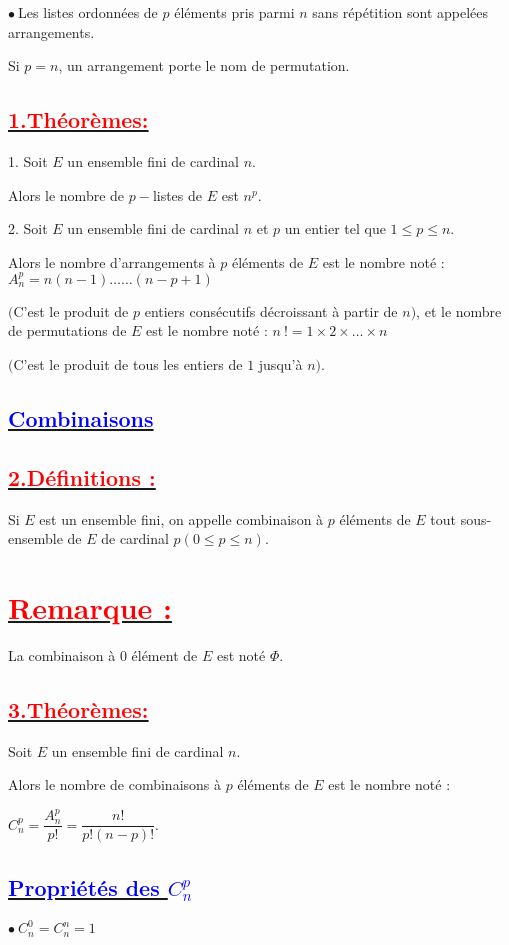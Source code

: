 \documentclass[12pt]{article}
\begin{document}
$\bullet\ $Les listes ordonnées de $p$ éléments pris parmi $n$ sans répétition sont appelées arrangements.

Si $p=n$, un arrangement porte le nom de permutation.
\subsection*{\underline{\textbf{\textcolor{red}{1.Théorèmes:}}}}
1. Soit $E$ un ensemble fini de cardinal $n.$

Alors le nombre de $p-$listes de $E$ est $n^{p}.$

2. Soit $E$ un ensemble fini de cardinal $n$ et $p$ un entier tel que $1\leq p\leq n.$

Alors le nombre d'arrangements à $p$ éléments de $E$ est le nombre noté : $A_{n}^{p}=n(n-1)\ldots\ldots(n-p+1)$

$($C'est le produit de $p$ entiers consécutifs décroissant à partir de $n)$, et le nombre de permutations de $E$ est le nombre noté : $n\ !=1\times 2\times\ldots\times n$

$($C'est le produit de tous les entiers de $1$ jusqu'à $n).$
\subsection*{\underline{\textbf{\textcolor{blue}{Combinaisons}}}}
\subsection*{\underline{\textbf{\textcolor{red}{2.Définitions :}}}}
Si $E$ est un ensemble fini, on appelle combinaison à $p$ éléments de $E$ tout sous-ensemble de $E$ de cardinal $p(0\leq p\leq n).$
\section*{\underline{\textbf{\textcolor{red}{Remarque :}}}}
La combinaison à $0$ élément de $E$ est noté $\Phi.$
\subsection*{\underline{\textbf{\textcolor{red}{3.Théorèmes:}}}}
Soit $E$ un ensemble fini de cardinal $n.$

Alors le nombre de combinaisons à $p$ éléments de $E$ est le nombre noté :

$C_{n}^{p}=\dfrac{A_{n}^{p}}{p!}=\dfrac{n!}{p!(n-p)!}.$
\subsection*{\underline{\textbf{\textcolor{blue}{Propriétés des $C_{n}^{p}$}}}}
$\bullet\ C_{n}^{0}=C_{n}^{n}=1$
\end{document}
